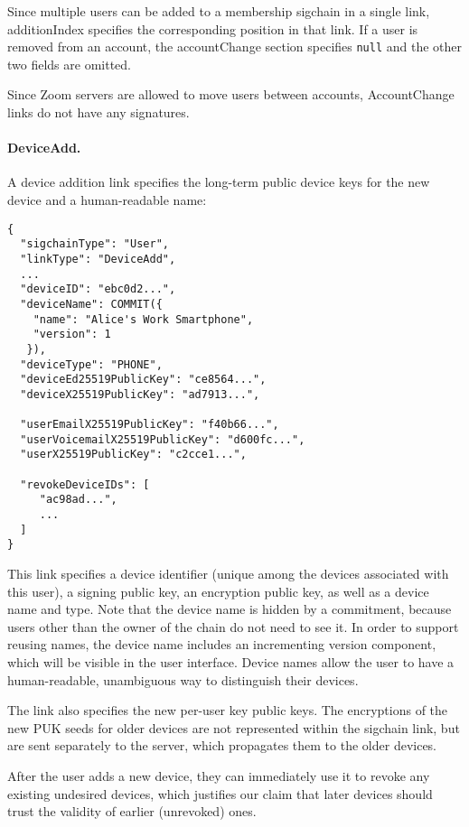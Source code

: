Since multiple users can be added to a membership sigchain in a single link, \textsf{additionIndex}
specifies the corresponding position in that link. If a user is removed from an account, the
\textsf{accountChange} section specifies \accountID \texttt{null} and the other two fields are
omitted.

Since Zoom servers are allowed to move users between accounts, \textsf{AccountChange} links do not
have any signatures.

\paragraph{DeviceAdd.} A device addition link specifies the long-term public device keys for the new
device and a human-readable name:

\begin{Verbatim}
{
  "sigchainType": "User",
  "linkType": "DeviceAdd",
  ...
  "deviceID": "ebc0d2...",
  "deviceName": COMMIT({
    "name": "Alice's Work Smartphone",
    "version": 1
   }),
  "deviceType": "PHONE",
  "deviceEd25519PublicKey": "ce8564...",
  "deviceX25519PublicKey": "ad7913...",

  "userEmailX25519PublicKey": "f40b66...",
  "userVoicemailX25519PublicKey": "d600fc...",
  "userX25519PublicKey": "c2cce1...",

  "revokeDeviceIDs": [
     "ac98ad...",
     ...
  ]
}
\end{Verbatim}

This link specifies a device identifier (unique among the devices associated with this user), a
signing public key, an encryption public key, as well as a device name and type. Note that the
device name is hidden by a commitment, because users other than the owner of the chain do not need
to see it. In order to support reusing names, the device name includes an incrementing version
component, which will be visible in the user interface. Device names allow the user to have a
human-readable, unambiguous way to distinguish their devices.

The link also specifies the new per-user key public keys. The encryptions of the new PUK seeds for
older devices are not represented within the sigchain link, but are sent separately to the server,
which propagates them to the older devices.

After the user adds a new device, they can immediately use it to revoke any existing undesired
devices, which justifies our claim that later devices should trust the validity of earlier
(unrevoked) ones.

